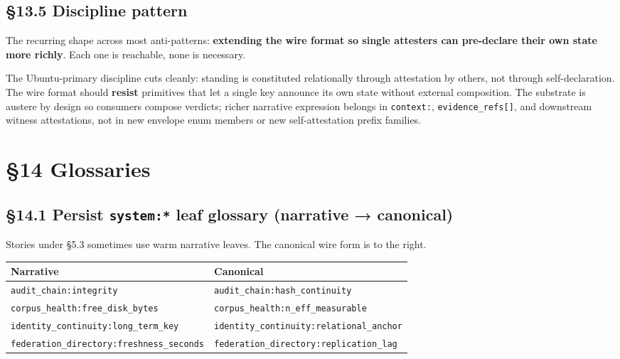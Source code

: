 \documentclass[11pt]{article}
\begin{document}
\subsection*{§13.5 Discipline pattern}


The recurring shape across most anti-patterns: \textbf{extending the wire format so single attesters can pre-declare their own state more richly}. Each one is reachable, none is necessary.


The Ubuntu-primary discipline cuts cleanly: standing is constituted relationally through attestation by others, not through self-declaration. The wire format should \textbf{resist} primitives that let a single key announce its own state without external composition. The substrate is austere by design so consumers compose verdicts; richer narrative expression belongs in \texttt{context:}, \texttt{evidence\_refs[]}, and downstream witness attestations, not in new envelope enum members or new self-attestation prefix families.




\clearpage


\section*{§14 Glossaries}


\subsection*{§14.1 Persist \texttt{system:*} leaf glossary (narrative → canonical)}


Stories under §5.3 sometimes use warm narrative leaves. The canonical wire form is to the right.


{\footnotesize
\begin{longtable}{|p{8.0cm}|p{8.0cm}|}\hline
\textbf{Narrative} & \textbf{Canonical} \\ \hline\endhead
\texttt{audit\_chain:integrity} & \texttt{audit\_chain:hash\_continuity} \\ \hline
\texttt{corpus\_health:free\_disk\_bytes} & \texttt{corpus\_health:n\_eff\_measurable} \\ \hline
\texttt{identity\_continuity:long\_term\_key} & \texttt{identity\_continuity:relational\_anchor} \\ \hline
\texttt{federation\_directory:freshness\_seconds} & \texttt{federation\_directory:replication\_lag} \\ \hline
\end{longtable}}
\end{document}
